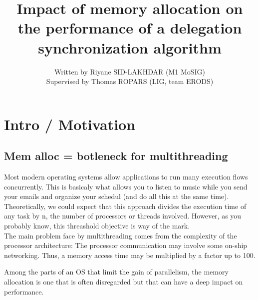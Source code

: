 \documentclass[10pt]{article}											%
\begin{document}
\title{Impact of memory allocation on the performance of a delegation synchronization algorithm}
\author{Written by Riyane SID-LAKHDAR (M1 MoSIG)\\
Supervised by Thomas ROPARS (LIG, team ERODS)}
\maketitle




\tableofcontents
\newpage






\section{Intro / Motivation}
\subsection{Mem alloc = botleneck for multithreading}
		Most modern operating systems allow applications to run many execution flows concurrently.   This is basicaly what allows you to listen to music while you send your emails and organize your schedul (and do all this at the same time).\\

		Theoretically, we could expect that this approach divides the execution time of any task by n, the number of processors or threads involved.
		However, as you probably know, this threashold objective is way of the mark.\\

		The main problem face by multithreading comes from the complexity of the processor architecture:   The processor communication may involve some on-ship networking.   Thus, a memory access time may be multiplied by a factor up to 100.

		Among the parts of an OS that limit the gain of parallelism, the memory allocation is one that is often disregarded but that can have a deep impact on performance.


\end{document}
